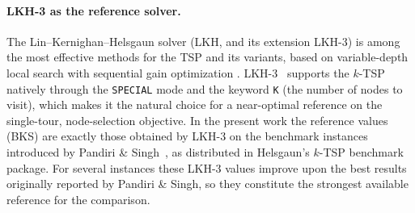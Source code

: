 \documentclass[conference]{IEEEtran}
\begin{document}
\paragraph{LKH-3 as the reference solver.}
The Lin--Kernighan--Helsgaun solver (LKH, and its extension LKH-3) is among the most effective methods for the TSP and its variants, based on variable-depth local search with sequential gain optimization \cite{Helsgaun,lin1973}. LKH-3~\cite{helsgaun2017lkh3} supports the $k$-TSP natively through the \texttt{SPECIAL} mode and the keyword \texttt{K} (the number of nodes to visit), which makes it the natural choice for a near-optimal reference on the single-tour, node-selection objective. In the present work the reference values (BKS) are exactly those obtained by LKH-3 on the benchmark instances introduced by Pandiri \& Singh~\cite{pandiri2020}, as distributed in Helsgaun's $k$-TSP benchmark package. For several instances these LKH-3 values improve upon the best results originally reported by Pandiri \& Singh, so they constitute the strongest available reference for the comparison.
\end{document}
